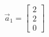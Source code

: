 \documentclass[preview]{standalone}
\begin{document}
\begin{align*}
\vec{a}_1=\begin{bmatrix} 2 \\ 2 \\ 0 \end{bmatrix}
\end{align*}
\end{document}
